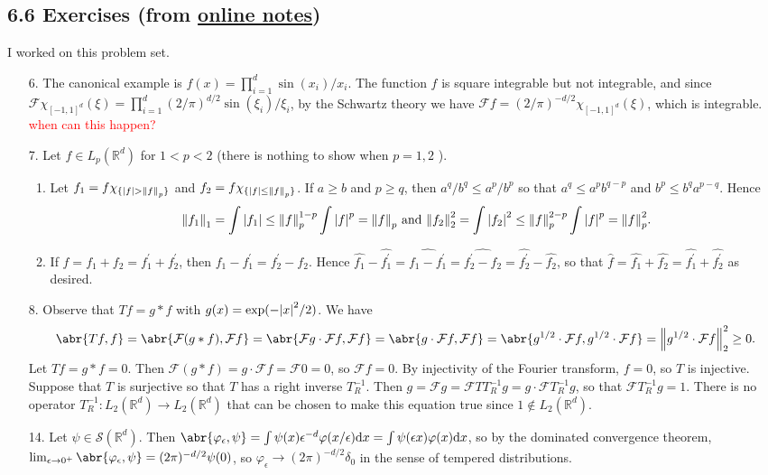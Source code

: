 \documentclass[11pt,leqno]{article}
\theoremstyle{plain}
\theoremstyle{definition}
\numberwithin{equation}{section}
\numberwithin{lem}{section}
\begin{document}
\subsection*{6.6 Exercises (from \href{https://users.oden.utexas.edu/~arbogast/appMath08c.pdf}{online notes})}
I worked on this problem set.
\begin{enumerate}
    \item[6.] The canonical example is $f(x) = \prod_{i=1}^d\sin(x_i)/x_i$. The function $f$ is square integrable but not integrable, and since $\mathcal F\chi_{[-1,1]^d}(\xi) = \prod_{i=1}^d(2/\pi)^{d/2}\sin(\xi_i)/\xi_i$, by the Schwartz theory we have $\mathcal Ff = (2/\pi)^{-d/2}\chi_{[-1,1]^d}(\xi)$, which is integrable. \textcolor{red}{when can this happen?}
    \item[7.] Let $f\in L_p(\mathbb R^d)$ for $1 < p < 2$ (there is nothing to show when $p = 1,2$  ). \begin{enumerate}
      \item Let $f_1 = f\chi_{\{\abs{f}>\norm{f}_p\}}$ and $f_2 = f\chi_{\{\abs{f}\leq \norm{f}_p\}}$. If $a\geq b$ and $p\geq q$, then $a^q/b^q\leq a^p/b^p$ so that $a^q\leq a^pb^{q-p}$ and $b^p\leq b^{q}a^{p-q}$. Hence 
      \[\norm{f_1}_1 = \int \abs{f_1}\leq \norm{f}_p^{1-p}\int \abs{f}^p = \norm{f}_p\text{ and }\norm{f_2}_2^2 = \int \abs{f_2}^2\leq \norm{f}_p^{2-p}\int\abs{f}^p = \norm{f}_p^2.\]
      \item If $f = f_1 + f_2 = f_1^\prime + f_2^\prime$, then $f_1 - f_1^\prime = f_2^\prime - f_2$. Hence $\hat{f_1} - \hat{f_1^\prime} = \widehat{f_1 - f_1^\prime} = \widehat{f_2^\prime - f_2} = \hat{f_2^\prime} - \hat{f_2}$, so that $\hat{f} = \hat{f_1} + \hat{f_2} = \hat{f_1^\prime} + \hat{f_2^\prime}$ as desired.
    \end{enumerate}
    \item[8.] Observe that $Tf = g\ast f$ with $g(x)= \exp\relax(-\abs{x}^2/2)$. We have 
    \[\abr{Tf,f} = \abr{\mathcal F(g\ast f),\mathcal Ff} = \abr{\mathcal Fg\cdot \mathcal Ff,\mathcal Ff} = \abr{g\cdot \mathcal Ff,\mathcal Ff} = \abr{g^{1/2}\cdot\mathcal Ff,g^{1/2}\cdot\mathcal Ff} = \norm{g^{1/2}\cdot\mathcal Ff}_2^2\geq 0.\]
    Let $Tf = g\ast f = 0$. Then $\mathcal F(g\ast f) = g\cdot\mathcal Ff = \mathcal F0 = 0$, so $\mathcal Ff = 0$. By injectivity of the Fourier transform, $f = 0$, so $T$ is injective. Suppose that $T$ is surjective so that $T$ has a right inverse $T_R^{-1}$. Then $g = \mathcal Fg = \mathcal FTT_R^{-1}g = g\cdot\mathcal FT_R^{-1}g$, so that $\mathcal FT_R^{-1}g = 1$. There is no operator $T_R^{-1}\colon L_2(\mathbb R^d)\to L_2(\mathbb R^d)$ that can be chosen to make this equation true since $1\not\in L_2(\mathbb R^d)$.
    \item[14.] Let $\psi\in \mathcal S(\mathbb R^d)$. Then $\abr{\varphi_\epsilon,\psi} = \int\psi(x)\epsilon^{-d}\varphi(x/\epsilon)\dd x = \int\psi(\epsilon x)\varphi(x)\dd x$, so by the dominated convergence theorem, $\lim_{\epsilon\to 0^+}\abr{\varphi_\epsilon, \psi} = (2\pi)^{-d/2}\psi(0)$, so $\varphi_\epsilon\to (2\pi)^{-d/2}\delta_0$ in the sense of tempered distributions.
    

\end{enumerate}
\end{document}
